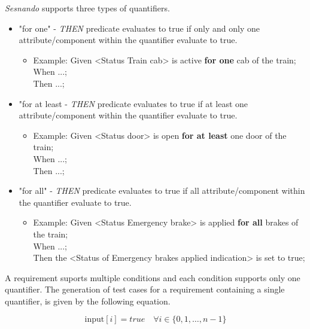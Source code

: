 \textit{Sesnando} supports three types of quantifiers.
\begin{itemize}
    \item "for one" - \textit{THEN} predicate evaluates to true if only and only one attribute/component within the quantifier evaluate to true.
        \begin{itemize}
            \item Example: Given <Status Train cab> is active \textbf{for one} cab of the train;\\
            When ...;\\
            Then ...;\\
        \end{itemize}
    \item "for at least - \textit{THEN} predicate evaluates to true if at least one attribute/component within the quantifier evaluate to true.
        \begin{itemize}
            \item Example: Given <Status door> is open \textbf{for at least} one door of the train;\\
            When ...;\\
            Then ...;\\
        \end{itemize}
    \item "for all" - \textit{THEN} predicate evaluates to true if all attribute/component within
    the quantifier evaluate to true.
        \begin{itemize}
            \item Example: Given <Status Emergency brake> is applied \textbf{for all} brakes of the train;\\
            When ...;\\
            Then the <Status of Emergency brakes applied indication> is set to true;\\
        \end{itemize}
\end{itemize}

A requirement suports multiple conditions and each condition supports only one quantifier.
The generation of test cases for a requirement containing a single quantifier, is given by the following equation.

\begin{equation} \label{eq1}
    \text{input}[i] = true \quad \forall i \in \{0, 1, \dots , n-1\}
\end{equation}

